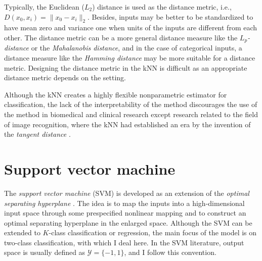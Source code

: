 \documentclass[12pt]{article}
\begin{document}
Typically, the Euclidean ($L_2$) distance is used as the distance metric, i.e., $D(x_0,x_i) = \|x_0 - x_i\|_2$. Besides, inputs may be better to be standardized to have mean zero and variance one when units of the inputs are different from each other. The distance metric can be a more general distance measure like the {\it $L_p$-distance} or the {\it Mahalanobis distance}, and in the case of categorical inputs, a distance measure like the {\it Hamming distance} may be more suitable for a distance metric. Designing the distance metric in the kNN is difficult as an appropriate distance metric depends on the setting. 

Although the kNN creates a highly flexible nonparametric estimator for classification, the lack of the interpretability of the method discourages the use of the method in biomedical and clinical research except research related to the field of image recognition, where the kNN had established an era by the invention of the {\it tangent distance} \parencite{Simard1992}.


\section{Support vector machine}

The {\it support vector machine} (SVM) is developed as an extension of the {\it optimal separating hyperplane} \parencite{Boser1992,Saitta1995}. The idea is to map the inputs into a high-dimensional input space through some prespecified nonlinear mapping and to construct an optimal separating hyperplane in the enlarged space. Although the SVM can be extended to $K$-class classification or regression, the main focus of the model is on two-class classification, with which I deal here. In the SVM literature, output space is usually defined as $\mathcal{Y} = \{-1,1\}$, and I follow this convention.
\end{document}
